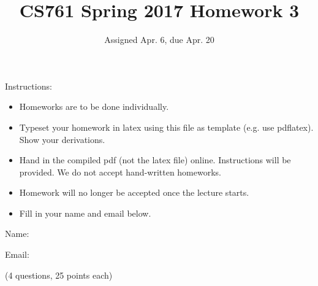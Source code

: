 \documentclass{article}
\title{CS761 Spring 2017 Homework 3}
\author{Assigned Apr. 6, due Apr. 20}
\date{}
\begin{document}
\maketitle

Instructions: 
\begin{itemize}
\item Homeworks are to be done individually.
\item Typeset your homework in latex using this file as template (e.g. use pdflatex).  Show your derivations.
\item Hand in the compiled pdf (not the latex file) online.  Instructions will be provided.  We do not accept hand-written homeworks.  
\item Homework will no longer be accepted once the lecture starts.
\item Fill in your name and email below.  
\end{itemize}


Name:                      

Email: 

\newpage %

(4 questions, 25 points each)
\end{document}
